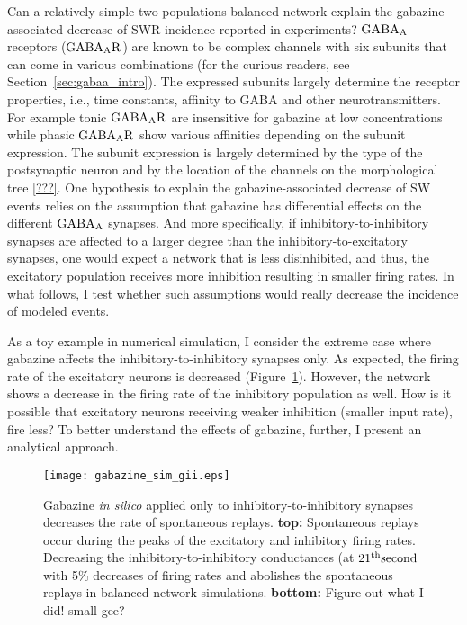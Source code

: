     Can a relatively simple two-populations balanced network explain the
    gabazine-associated decrease of SWR incidence reported in experiments?
    $\rm GABA_A$ receptors ($\rm GABA_A R$) are known to be complex channels
    with six subunits that can come in various combinations (for the curious
    readers, see Section~\ref{sec:gabaa_intro}). The expressed subunits largely
    determine the receptor properties, i.e., time constants, affinity to GABA
    and other neurotransmitters. For example tonic $\rm GABA_A R$ are
    insensitive for gabazine at low concentrations while phasic $\rm GABA_A R$
    show various affinities depending on the subunit expression. The subunit
    expression is largely determined by the type of the postsynaptic neuron and
    by the location of the channels on the morphological tree
    \ref{???}. One hypothesis to explain the gabazine-associated decrease of SW
    events relies on the assumption that gabazine has differential effects on
    the different $\rm GABA_A$ synapses. And more specifically, if
    inhibitory-to-inhibitory synapses are affected to a larger degree than the
    inhibitory-to-excitatory synapses, one would expect a network that is less
    disinhibited, and thus, the excitatory population receives more inhibition
    resulting in smaller firing rates. In what follows, I test whether such
    assumptions would really decrease the incidence of modeled events.

    As a toy example in numerical simulation, I consider the extreme case where
    gabazine affects the inhibitory-to-inhibitory synapses only. As expected,
    the firing rate of the excitatory neurons is decreased
    (Figure~\ref{fig:gabazine_sim_giionly}). However, the network shows a
    decrease in the firing rate of the inhibitory population as well. How is it
    possible that excitatory neurons receiving weaker inhibition (smaller input
    rate), fire less? To better understand the effects of gabazine, further, I
    present an analytical approach.
    
    \begin{figure}
      \texttt{[image: gabazine\_sim\_gii.eps]}
      \caption{
        Gabazine {\it in silico} applied only to inhibitory-to-inhibitory synapses
        decreases the rate of spontaneous replays. {\bf top:} Spontaneous replays
        occur during the peaks of the excitatory and inhibitory firing rates. 
        Decreasing the inhibitory-to-inhibitory conductances (at $21^{\rm th} \rm second$
        with 5\% decreases of firing rates and abolishes the spontaneous replays in
        balanced-network simulations. {\bf bottom:} Figure-out what I did! small gee?
      }
    \label{fig:gabazine_sim_giionly}
    \end{figure}

